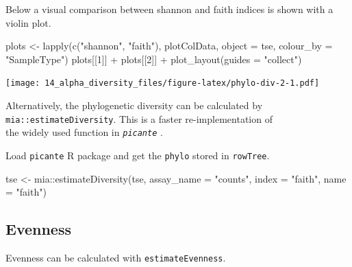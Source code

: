 \documentclass[
]{book}
\newenvironment{Shaded}{\begin{snugshade}}{\end{snugshade}}
\newcommand{\AttributeTok}[1]{\textcolor[rgb]{0.77,0.63,0.00}{#1}}
\newcommand{\DecValTok}[1]{\textcolor[rgb]{0.00,0.00,0.81}{#1}}
\newcommand{\FunctionTok}[1]{\textcolor[rgb]{0.00,0.00,0.00}{#1}}
\newcommand{\NormalTok}[1]{#1}
\newcommand{\OtherTok}[1]{\textcolor[rgb]{0.56,0.35,0.01}{#1}}
\newcommand{\SpecialCharTok}[1]{\textcolor[rgb]{0.00,0.00,0.00}{#1}}
\newcommand{\StringTok}[1]{\textcolor[rgb]{0.31,0.60,0.02}{#1}}
\begin{document}
Below a visual comparison between shannon and faith indices is shown with a violin plot.

\begin{Shaded}
\begin{Highlighting}[]
\NormalTok{plots }\OtherTok{\textless{}{-}} \FunctionTok{lapply}\NormalTok{(}\FunctionTok{c}\NormalTok{(}\StringTok{"shannon"}\NormalTok{, }\StringTok{"faith"}\NormalTok{),}
\NormalTok{                plotColData,}
                \AttributeTok{object =}\NormalTok{ tse, }\AttributeTok{colour\_by =} \StringTok{"SampleType"}\NormalTok{)}
\NormalTok{plots[[}\DecValTok{1}\NormalTok{]] }\SpecialCharTok{+}\NormalTok{ plots[[}\DecValTok{2}\NormalTok{]] }\SpecialCharTok{+}
  \FunctionTok{plot\_layout}\NormalTok{(}\AttributeTok{guides =} \StringTok{"collect"}\NormalTok{)}
\end{Highlighting}
\end{Shaded}

\texttt{[image: 14\_alpha\_diversity\_files/figure-latex/phylo-div-2-1.pdf]}

Alternatively, the phylogenetic diversity can be calculated by \texttt{mia::estimateDiversity}. This is a faster re-implementation of\\
the widely used function in \emph{\texttt{picante}} \citep[\citet{Kembel2010}]{R-picante}.

Load \texttt{picante} R package and get the \texttt{phylo} stored in \texttt{rowTree}.

\begin{Shaded}
\begin{Highlighting}[]
\NormalTok{tse }\OtherTok{\textless{}{-}}\NormalTok{ mia}\SpecialCharTok{::}\FunctionTok{estimateDiversity}\NormalTok{(tse, }
                              \AttributeTok{assay\_name =} \StringTok{"counts"}\NormalTok{,}
                              \AttributeTok{index =} \StringTok{"faith"}\NormalTok{, }
                              \AttributeTok{name =} \StringTok{"faith"}\NormalTok{)}
\end{Highlighting}
\end{Shaded}

\hypertarget{evenness}{%
\subsection{Evenness}\label{evenness}}

Evenness can be calculated with \texttt{estimateEvenness}.

\begin{Shaded}
\end{Shaded}
\end{document}
